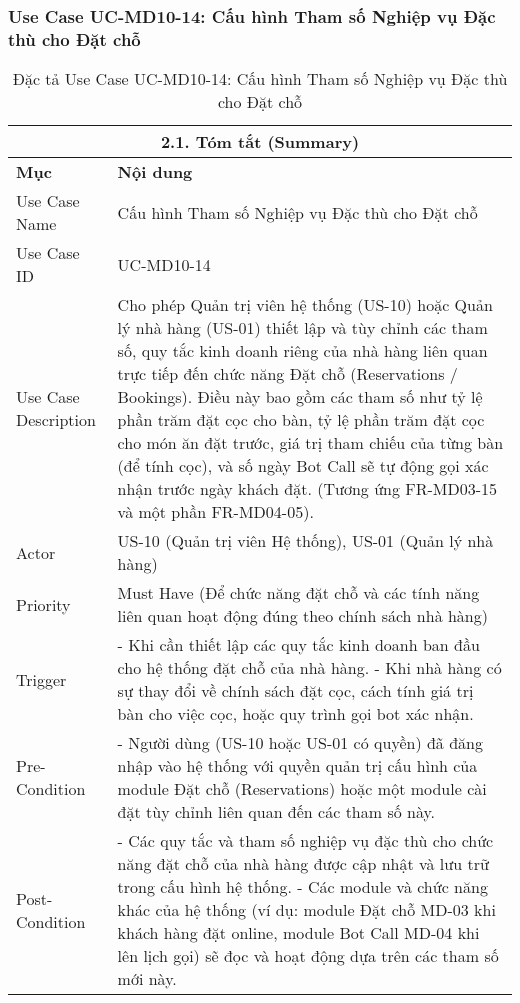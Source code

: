 \subsubsection{Use Case UC-MD10-14: Cấu hình Tham số Nghiệp vụ Đặc thù cho Đặt chỗ}
\begin{longtable}{|m{4cm}|p{11cm}|}
\caption{Đặc tả Use Case UC-MD10-14: Cấu hình Tham số Nghiệp vụ Đặc thù cho Đặt chỗ} \label{tab:uc_md10_14_full_v2_latex_fixed_in_codeblock} \\
\hline
\multicolumn{2}{|c|}{\textbf{2.1. Tóm tắt (Summary)}} \\
\hline
\textbf{Mục} & \textbf{Nội dung} \\
\hline
\endhead %
\midrule
\endfoot %
\bottomrule
\endlastfoot %
Use Case Name & Cấu hình Tham số Nghiệp vụ Đặc thù cho Đặt chỗ \\
\hline
Use Case ID & UC-MD10-14 \\
\hline
Use Case Description & Cho phép Quản trị viên hệ thống (US-10) hoặc Quản lý nhà hàng (US-01) thiết lập và tùy chỉnh các tham số, quy tắc kinh doanh riêng của nhà hàng liên quan trực tiếp đến chức năng Đặt chỗ (Reservations / Bookings). Điều này bao gồm các tham số như tỷ lệ phần trăm đặt cọc cho bàn, tỷ lệ phần trăm đặt cọc cho món ăn đặt trước, giá trị tham chiếu của từng bàn (để tính cọc), và số ngày Bot Call sẽ tự động gọi xác nhận trước ngày khách đặt. (Tương ứng FR-MD03-15 và một phần FR-MD04-05). \\
\hline
Actor & US-10 (Quản trị viên Hệ thống), US-01 (Quản lý nhà hàng) \\
\hline
Priority & Must Have (Để chức năng đặt chỗ và các tính năng liên quan hoạt động đúng theo chính sách nhà hàng) \\
\hline
Trigger & - Khi cần thiết lập các quy tắc kinh doanh ban đầu cho hệ thống đặt chỗ của nhà hàng. \newline - Khi nhà hàng có sự thay đổi về chính sách đặt cọc, cách tính giá trị bàn cho việc cọc, hoặc quy trình gọi bot xác nhận. \\
\hline
Pre-Condition & - Người dùng (US-10 hoặc US-01 có quyền) đã đăng nhập vào hệ thống với quyền quản trị cấu hình của module Đặt chỗ (Reservations) hoặc một module cài đặt tùy chỉnh liên quan đến các tham số này. \\
\hline
Post-Condition & - Các quy tắc và tham số nghiệp vụ đặc thù cho chức năng đặt chỗ của nhà hàng được cập nhật và lưu trữ trong cấu hình hệ thống. \newline - Các module và chức năng khác của hệ thống (ví dụ: module Đặt chỗ MD-03 khi khách hàng đặt online, module Bot Call MD-04 khi lên lịch gọi) sẽ đọc và hoạt động dựa trên các tham số mới này. \\

\end{longtable}
